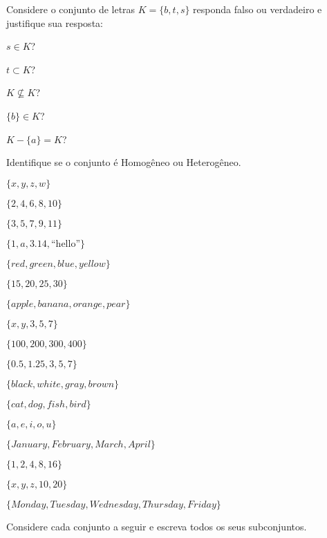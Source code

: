 \begin{questao}\label{test:Conjuntos4}
	Considere o conjunto de letras $K = \{b, t, s\}$ responda falso ou verdadeiro e justifique sua resposta:
\end{questao}

\begin{exerList}
	\item $s \in K$?
	\item $t \subset K$?
	\item $K \not\subseteq K$?
	\item $\{b\} \in K$?
	\item $K - \{a\} = K$?
\end{exerList}

\begin{questao}
  Identifique se o conjunto é Homogêneo ou Heterogêneo.
\end{questao}

\begin{exerList}
  \item $\{x, y, z, w\}$
  \item $\{2, 4, 6, 8, 10\}$
  \item $\{3, 5, 7, 9, 11\}$
  \item $\{1, a, 3.14, \text{``hello''}\}$
  \item $\{red, green, blue, yellow\}$
  \item $\{15, 20, 25, 30\}$
  \item $\{apple, banana, orange, pear\}$
  \item $\{x, y, 3, 5, 7\}$
  \item $\{100, 200, 300, 400\}$
  \item $\{0.5, 1.25, 3, 5, 7\}$
  \item $\{black, white, gray, brown\}$
  \item $\{cat, dog, fish, bird\}$
  \item $\{a, e, i, o, u\}$
  \item $\{January, February, March, April\}$
  \item $\{1, 2, 4, 8, 16\}$
  \item $\{x, y, z, 10, 20\}$
  \item $\{Monday, Tuesday, Wednesday, Thursday, Friday\}$
\end{exerList}

\begin{questao}\label{test:Conjuntos5}
	Considere cada conjunto a seguir e escreva todos os seus subconjuntos.
\end{questao}

